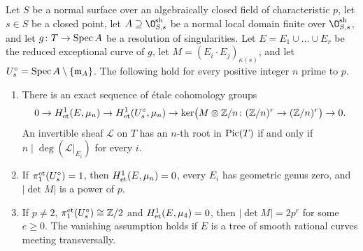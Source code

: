 \begin{lemma}\label{lem:kummer}
Let $S$ be a normal surface over an algebraically closed field of characteristic $p$, let $s\in S$ be a closed point, let $A\supseteq\O^{\rm sh}_{S,s}$ be a normal local domain finite over $\O^{\rm sh}_{S,s}$, and let $g\colon T\to\operatorname{Spec} A$ be a resolution of singularities.
Let $E = E_1\cup\dots\cup E_r$ be the reduced exceptional curve of $g$, let $M = (E_i\cdot E_j)_{\kappa(s)}$, and let $U_s^\circ = \operatorname{Spec} A\setminus\{\mathfrak m_A\}$.
The following hold for every positive integer $n$ prime to $p$.
\begin{enumerate}[label=\textup{(\arabic*)}]
\item There is an exact sequence of \'etale cohomology groups
\begin{equation}\label{eq:kummer-lattice-sequence}
  0\to H^1_{\rm et}(E,\mu_n)\to H^1_{\rm et}(U_s^\circ,\mu_n)\to\ker\bigl(M\otimes\mathbb{Z}/n\colon(\mathbb{Z}/n)^r\to(\mathbb{Z}/n)^r\bigr)\to 0.
\end{equation}
An invertible sheaf $\mathcal L$ on $T$ has an $n$-th root in $\operatorname{Pic}(T)$ if and only if $n\mid\deg(\mathcal L|_{E_i})$ for every $i$.
\item If $\pi_1^{\rm et}(U_s^\circ) = 1$, then $H^1_{\rm et}(E,\mu_n) = 0$, every $E_i$ has geometric genus zero, and $\lvert\det M\rvert$ is a power of $p$.
\item If $p\neq 2$, $\pi_1^{\rm et}(U_s^\circ)\cong\mathbb{Z}/2$ and $H^1_{\rm et}(E,\mu_4) = 0$, then $\lvert\det M\rvert = 2p^e$ for some $e\geq 0$.
The vanishing assumption holds if $E$ is a tree of smooth rational curves meeting transversally.
\end{enumerate}
\end{lemma}

